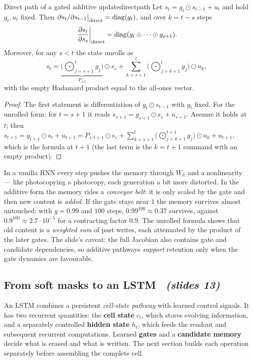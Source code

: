\documentclass[11pt,a4paper]{article}
\newcommand{\diag}{\operatorname{diag}}
\newcommand{\sltag}[1]{\texorpdfstring{\ \emph{(slides #1)}}{ (slides #1)}}
\begin{document}
\begin{proposition}{Direct path of a gated additive update}{directpath}
Let $s_t=g_t\odot s_{t-1}+u_t$ and hold $g_t,u_t$ fixed. Then $\partial s_t/\partial s_{t-1}\big|_{\rm direct}=\diag(g_t)$, and over $k=t-s$ steps
\[
\left.\frac{\partial s_t}{\partial s_s}\right|_{\rm direct}=\diag(g_t\odot\cdots\odot g_{s+1}).
\]
Moreover, for any $s<t$ the state unrolls as
\[
s_t=\underbrace{\Big(\textstyle\bigodot_{j=s+1}^{t}g_j\Big)}_{P_{s:t}}\odot s_s+\sum_{k=s+1}^{t}\Big(\textstyle\bigodot_{j=k+1}^{t}g_j\Big)\odot u_k ,
\]
with the empty Hadamard product equal to the all-ones vector.
\end{proposition}
\begin{proof}
The first statement is differentiation of $g_t\odot s_{t-1}$ with $g_t$ fixed. For the unrolled form: for $t=s+1$ it reads $s_{s+1}=g_{s+1}\odot s_s+u_{s+1}$. Assume it holds at $t$; then
$s_{t+1}=g_{t+1}\odot s_t+u_{t+1}=P_{s:t+1}\odot s_s+\sum_{k=s+1}^{t}\big(\bigodot_{j=k+1}^{t+1}g_j\big)\odot u_k+u_{t+1}$, which is the formula at $t+1$ (the last term is the $k=t+1$ summand with an empty product).
\end{proof}

\begin{intuition}
In a vanilla RNN every step pushes the memory through $W_h$ and a nonlinearity --- like photocopying a photocopy, each generation a bit more distorted. In the additive form the memory rides a \emph{conveyor belt}: it is only scaled by the gate and then new content is \emph{added}. If the gate stays near $1$ the memory survives almost untouched: with $g=0.99$ and $100$ steps, $0.99^{100}\approx0.37$ survives, against $0.9^{100}\approx2.7\cdot10^{-5}$ for a contracting factor $0.9$. The unrolled formula shows that old content is a \emph{weighted sum} of past writes, each attenuated by the product of the later gates. The slide's caveat: the full Jacobian also contains gate and candidate dependencies, so additive pathways \emph{support} retention only when the gate dynamics are favourable.
\end{intuition}

\subsection{From soft masks to an LSTM \sltag{13}}

An LSTM combines a persistent \emph{cell-state pathway} with learned control signals. It has two recurrent quantities: the \textbf{cell state} $c_t$, which stores evolving information, and a separately controlled \textbf{hidden state} $h_t$, which feeds the readout and subsequent recurrent computations. Learned \textbf{gates} and a \textbf{candidate memory} decide what is erased and what is written. The next section builds each operation separately before assembling the complete cell.
\end{document}
